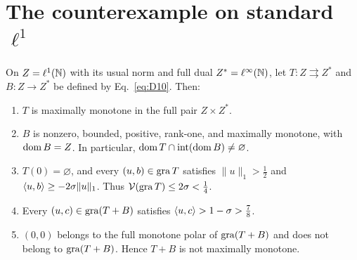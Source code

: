 \section{The counterexample on standard $\ell^1$}
\label{sec:l1}
\renewcommand{\thetheorem}{L}
\begin{theorem}\label{thm:L}
On $Z=\ell^1(\mathbb N)$ with its usual norm and full dual $Z^*=\ell^\infty(\mathbb N)$,
let $T:Z\rightrightarrows Z^*$ and $B:Z\to Z^*$ be defined by Eq.~\eqref{eq:D10}.
Then:
\begin{enumerate}
\item $T$ is maximally monotone in the full pair $Z\times Z^*$.
\item $B$ is nonzero, bounded, positive, rank-one, and maximally monotone,
with $\operatorname{dom} B=Z$. In particular,
$\operatorname{dom} T\cap\operatorname{int}(\operatorname{dom} B)\ne\varnothing$.
\item $T(0)=\varnothing$, and every $(u,b)\in\operatorname{gra} T$ satisfies
$\|u\|_1>\frac{1}{2}$ and $\langle u,b\rangle\ge-2\sigma\|u\|_1$.
Thus $\mathcal V(\operatorname{gra} T)\le2\sigma<\frac{1}{4}$.
\item Every $(u,c)\in\operatorname{gra}(T+B)$ satisfies
$\langle u,c\rangle>1-\sigma>\frac{7}{8}$.
\item $(0,0)$ belongs to the full monotone polar of $\operatorname{gra}(T+B)$ and does
not belong to $\operatorname{gra}(T+B)$. Hence $T+B$ is not maximally monotone.
\end{enumerate}
\end{theorem}
